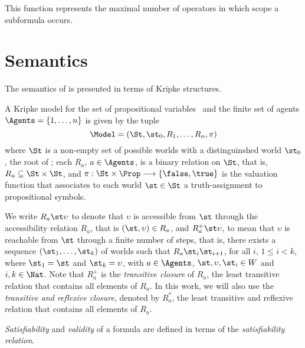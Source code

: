 This function represents the maximal number of operators in which scope a
subformula occurs.

\section{Semantics}%
\label{semantics}

The semantics of  is presented in terms of Kripke structures.

\begin{definition}%
\label{def:semantics}
    A Kripke model for the set of propositional variables \Prop~and the finite
    set of agents $\Agents = \{1, \ldots, n\}$ is given by the tuple 
    \begin{equation}
        \Model = (\St, \st_0, R_1, \ldots, R_n, \pi)
    \end{equation}
    where $\St$ is a non-empty set of possible worlds with a distinguinshed world
    $\st_0$, the root of \Model; each $R_a$, $a \in \Agents$, is a binary relation
    on $\St$, that is, $R_a \subseteq \St \times \St$, and $\pi: \St \times \Prop
    \longrightarrow \{\false, \true\}$ is the valuation function that associates
    to each world $\st \in \St$ a truth-assignment to propositional symbols.
\end{definition}

We write $R_a \st \upsilon$ to denote that $\upsilon$ is accessible from $\st$
through the accessibility relation $R_a$, that is $(\st, \upsilon) \in R_a$, and
$R^+_a \st \upsilon$, to mean that $\upsilon$ is reachable from $\st$ through a
finite number of steps, that is, there exists a sequence $(\st_1, \ldots,
\st_k)$ of worlds such that $R_a \st_i \st_{i+1}$, for all $i$, $1 \leq i < k$, where
$\st_1 = \st$ and $\st_k = \upsilon$, with $a \in \Agents$, $\st, \upsilon,
\st_i \in W$ and $i, k \in \Nat$. Note that $R_a^+$ is the \emph{transitive
closure} of $R_a$, the least transitive relation that contains all elements of $R_a$.
In this work, we will also use the \emph{transitive and reflexive closure},
denoted by $R_a^*$, the least transitive and reflexive relation that contains all
elements of $R_a$.

\emph{Satisfiability} and \emph{validity} of a formula are defined in terms of
the \emph{satisfiability relation}.

